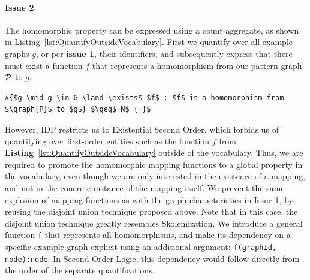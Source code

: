 \paragraph{Issue 2}
The homomorphic property can be expressed using a count aggregate, as shown in Listing~\ref{lst:QuantifyOutsideVocabulary}. 
First we quantify over all example graphs $g$, or per \textbf{issue 1}, their identifiers, and subsequently express that there must exist a function $f$ that represents a homomorphism from our pattern graph $\mathcal{P}$ to $g$.
\begin{center}
\begin{minipage}{0.64\linewidth}
\begin{lstlisting}[mathescape, caption=Quantifying over functions outside the vocabulary, label=lst:QuantifyOutsideVocabulary]
#{$g \mid g \in G \land \exists$ $f$ : $f$ is a homomorphism from $\graph{P}$ to $g$} $\geq$ N$_{+}$
\end{lstlisting}
\end{minipage}
\end{center}
However, IDP restricts us to Existential Second Order, which forbids us of quantifying over first-order entities such as the function $f$ from \textbf{Listing}~\ref{lst:QuantifyOutsideVocabulary} outside of the vocabulary.
Thus, we are required to promote the homomorphic mapping functions to a global property in the vocabulary, even though we are only interested in the existence of a mapping, and not in the concrete instance of the mapping itself.
We prevent the same explosion of mapping functions as with the graph characteristics in Issue 1, by reusing the disjoint union technique proposed above. 
Note that in this case, the disjoint union technique greatly resembles Skolemization. 
We introduce a general function \verb|f| that represents all homomorphisms, and make its dependency on a specific example graph explicit using an additional argument:
\verb|f(graphId, node):node|.
In Second Order Logic, this dependency would follow directly from the order of the separate quantifications.

